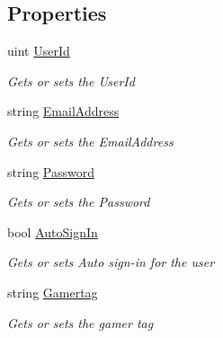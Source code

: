 \subsection*{Properties}
\begin{DoxyCompactItemize}
\item 
uint \hyperlink{class_microsoft_1_1_tools_1_1_windows_device_portal_1_1_device_portal_1_1_user_info_a81ddf132c000aa5f6a072a63312dd20d}{User\+Id}
\begin{DoxyCompactList}\small\item\em Gets or sets the User\+Id \end{DoxyCompactList}\item 
string \hyperlink{class_microsoft_1_1_tools_1_1_windows_device_portal_1_1_device_portal_1_1_user_info_a7ef81611c0e9aebd809626847455467f}{Email\+Address}
\begin{DoxyCompactList}\small\item\em Gets or sets the Email\+Address \end{DoxyCompactList}\item 
string \hyperlink{class_microsoft_1_1_tools_1_1_windows_device_portal_1_1_device_portal_1_1_user_info_a9211fecccaea4624abad5af1764dafeb}{Password}
\begin{DoxyCompactList}\small\item\em Gets or sets the Password \end{DoxyCompactList}\item 
bool \hyperlink{class_microsoft_1_1_tools_1_1_windows_device_portal_1_1_device_portal_1_1_user_info_a7dc3240d8dac2205a5443bfdaade0463}{Auto\+Sign\+In}
\begin{DoxyCompactList}\small\item\em Gets or sets Auto sign-\/in for the user \end{DoxyCompactList}\item 
string \hyperlink{class_microsoft_1_1_tools_1_1_windows_device_portal_1_1_device_portal_1_1_user_info_ad53d01d610b2f192296449ae0192ad94}{Gamertag}
\begin{DoxyCompactList}\small\item\em Gets or sets the gamer tag \end{DoxyCompactList}\item 

\end{DoxyCompactItemize}
